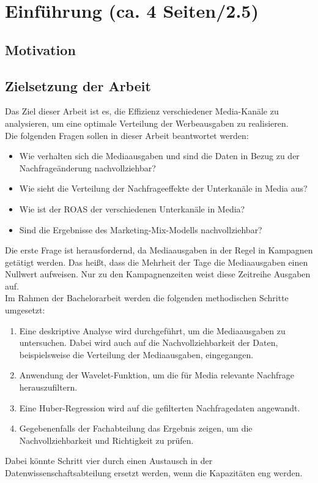 
\newpage
\section{Einführung (ca. 4 Seiten/2.5)}
\label{Einführung}
\subsection{Motivation}
\iffalse
Erkläre, warum das Thema Media \ac{ROAS} im Kontext von bonprix relevant ist.
Diskutiere die Bedeutung von Marketing-Analysen in der heutigen digitalen Welt und wie sie Unternehmen helfen, ihre Strategien zu optimieren.
Füge aktuelle Statistiken oder Beispiele aus der Branche hinzu, um deine Argumente zu untermauern.
\fi
\subsection{Zielsetzung der Arbeit}

Das Ziel dieser Arbeit ist es, die Effizienz verschiedener Media-Kanäle zu analysieren, um eine optimale Verteilung der Werbeausgaben zu realisieren. \\
Die folgenden Fragen sollen in dieser Arbeit beantwortet werden:
\begin{itemize}
    \item Wie verhalten sich die Mediaausgaben und sind die Daten in Bezug zu der Nachfrageänderung nachvollziehbar? 
    \item Wie sieht die Verteilung der Nachfrageeffekte der Unterkanäle in Media aus?
    \item  Wie ist der ROAS der verschiedenen Unterkanäle in Media?
    \item Sind die Ergebnisse des Marketing-Mix-Modells nachvollziehbar? 
\end{itemize} 
Die erste Frage ist herausfordernd, da Mediaausgaben in der Regel in Kampagnen getätigt werden. Das heißt, dass die Mehrheit der Tage die Mediaausgaben einen Nullwert aufweisen. Nur zu den Kampagnenzeiten weist diese Zeitreihe Ausgaben auf.\\
Im Rahmen der Bachelorarbeit werden die folgenden methodischen Schritte umgesetzt:
\begin{enumerate}
    \item Eine deskriptive Analyse wird durchgeführt, um die Mediaausgaben zu untersuchen. Dabei wird auch auf die Nachvollziehbarkeit der Daten, beispielsweise die Verteilung der Mediaausgaben, eingegangen.
    \item Anwendung der Wavelet-Funktion, um die für Media relevante Nachfrage herauszufiltern.
    \item Eine Huber-Regression wird auf die gefilterten Nachfragedaten angewandt.
    \item Gegebenenfalls der Fachabteilung das Ergebnis zeigen, um die Nachvollziehbarkeit und Richtigkeit zu prüfen.
\end{enumerate}
Dabei könnte Schritt vier durch einen Austausch in der Datenwissenschaftsabteilung ersetzt werden, wenn die Kapazitäten eng werden.   

